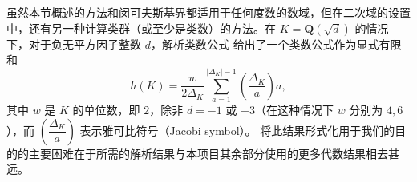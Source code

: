 \documentclass[sigplan,10pt,nonacm,
screen]{acmart} \settopmatter{printfolios=true,printccs=false,printacmref=false}
\newcommand{\sd}[1]{\todo[color=yellow]{SD: #1}}
\newcommand{\QQ}{\mathbf{Q}}
\newcommand{\ZZ}{\mathbf{Z}}
\DeclareMathOperator{\SL}{SL}
\DeclareMathOperator{\PSL}{PSL}
\begin{document}
虽然本节概述的方法和闵可夫斯基界都适用于任何度数的数域，但在二次域的设置中，还有另一种计算类群（或至少是类数）的方法。在 $K=\QQ(\sqrt{d})$ 的情况下，对于负无平方因子整数 $d$，解析类数公式 \cite[Section VII.5]{Neukirch} 给出了一个类数公式作为显式有限和
\begin{equation*}
h(K) = \dfrac{w}{2\Delta_K} \sum_{a=1}^{|\Delta_K|-1} \left(\dfrac{\Delta_K}{a}\right) a,
\end{equation*}
其中 $w$ 是 $K$ 的单位数，即 $2$，除非 $d=-1$ 或 $-3$（在这种情况下 $w$ 分别为 $4,6$），而 $\left(\dfrac{\Delta_K}{a}\right)$ 表示雅可比符号（Jacobi symbol）。
将此结果形式化用于我们的目的的主要困难在于所需的解析结果与本项目其余部分使用的更多代数结果相去甚远。

%
\end{document}
